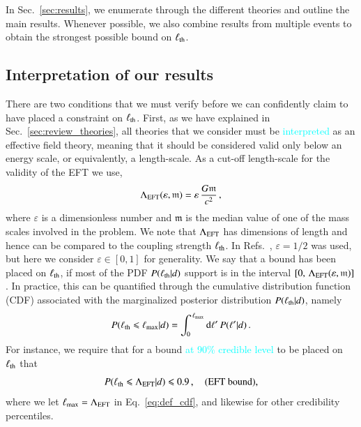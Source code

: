\documentclass[twocolumn,
               prd,
               aps,
               superscriptaddress,
               tightenlines,
               nofootinbib,
               eqsecnum,
               amsfonts,
               amsmath,
               longbibliography]{revtex4-1}
\newcommand{\dd}{{\rm d}}
\newcommand{\hs}[1]{{\textcolor{blue}{{[HS: #1]}} }}
\newcommand{\ab}[1]{{\textcolor{cyan}{{#1}} }}
\begin{document}
In Sec.~\ref{sec:results}, we enumerate through the different theories and
outline the main results. Whenever possible, we also combine results from
multiple events to obtain the strongest possible bound on $\ell_{\rm th}$.



\subsection{Interpretation of our results}
\label{sec:remarks}

There are two conditions that we must verify before we can confidently claim to
have placed a constraint on $\ell_{\rm th}$. First, as we have explained in Sec.~\ref{sec:review_theories}, all theories that we
consider must be \ab{interpreted} as an effective field theory, meaning that it should be
considered valid only below an energy scale, or equivalently, a length-scale.
%
As a cut-off length-scale for the validity of the EFT we use,
%
\begin{equation}
\Lambda_{\rm EFT} (\varepsilon, \mathfrak{m}) = \varepsilon \, \frac{G \mathfrak{m}}{c^2} \,,
\label{eq:def_cutoff}
\end{equation}
%
where $\varepsilon$ is a dimensionless number and $\mathfrak{m}$ is the median
value of one of the mass scales involved in the problem.
%
We note that $\Lambda_{\rm EFT}$ has dimensions of length and hence can be compared to the coupling strength $\ell_{\rm th}$.
%
In Refs.~\cite{Nair:2019iur,Perkins:2021mhb,Lyu:2022gdr}, $\varepsilon = 1/2$ was used,
but here we consider $\varepsilon \in [0, 1]$ for generality.
%
We say that a bound has been placed on $\ell_{\rm th}$, if most of the PDF $P(\ell_{\rm th} | d)$ support is in the interval
$[0, \, \Lambda_{\rm EFT}(\varepsilon, \mathfrak{m})]$.
%
In practice, this can be quantified through the cumulative distribution function
(CDF) associated with the marginalized posterior distribution $P(\ell_{\rm th} | d)$, namely
%
\begin{equation}
P(\ell_{\rm th} \leqslant \ell_{\rm max} | d) = \int_{0}^{\,\ell_{\rm max}} \dd \ell'\, P(\ell' | d) \,.
\label{eq:def_cdf}
\end{equation}
%
For instance, we require that for a bound \ab{at 90\% credible level} to be placed on $\ell_{\rm th}$ that
%
\begin{equation}
P(\ell_{\rm th} \leqslant \Lambda_{\rm EFT} | d) \leqslant 0.9 \,,
\quad \textrm{(EFT bound)},
\label{eq:eft_bound}
\end{equation}
%
where we let $\ell_{\rm max} = \Lambda_{\rm EFT}$ in Eq.~\eqref{eq:def_cdf}, and
likewise for other credibility percentiles. 
\end{document}
